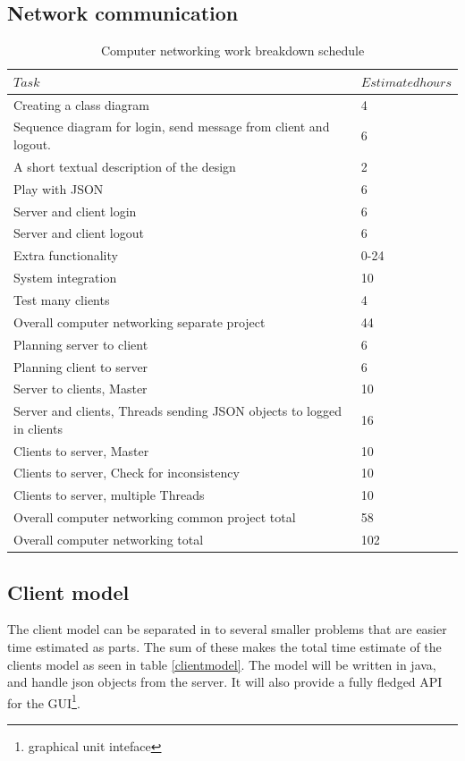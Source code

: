 \documentclass[a4paper, english, 12pt]{article}
\begin{document}
\subsection{Network communication}
\begin{table}[h!]
    \begin{center}
    \caption{Computer networking work breakdown schedule}
    \label{Network}
    \vspace{0,5cm}
    \begin{tabular}{ll} \\
        \hline
        $Task$  & $Estimated hours$ \\
        \hline
Creating a class diagram & 4 \\
Sequence diagram for login, send message from client and logout. & 6 \\
A short textual description of the design & 2 \\
Play with JSON & 6 \\
Server and client login & 6\\
Server and client logout & 6\\
Extra functionality & 0-24 \\
System integration & 10 \\
Test many clients & 4 \\
Overall computer networking separate project & 44 \\
\hline
Planning server to client & 6 \\
Planning client to server & 6 \\
Server to clients, Master & 10 \\
Server and clients, Threads sending JSON objects to logged in clients & 16\\
Clients to server, Master & 10\\
Clients to server, Check for inconsistency & 10\\
Clients to server, multiple Threads & 10\\
Overall computer networking common project total& 58 \\
\hline
Overall computer networking total & 102 \\
        \hline
    \end{tabular}
    \end{center}
\end{table}


\subsection{Client model}
The client model can be separated in to several smaller problems that are easier time estimated as parts. The sum of these makes the total time estimate of the clients model as seen in table \ref{clientmodel}. The model will be written in java, and handle json objects from the server. It will also provide a fully fledged API for the GUI\footnote{graphical unit inteface}. 
\end{document}
